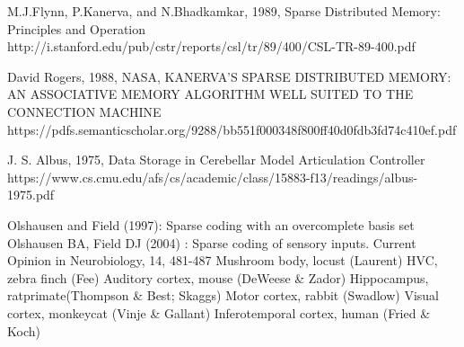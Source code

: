 \documentclass[10pt,a4paper]{article}
\begin{document}
\newpage



\begin{thebibliography}{4}

 M.J.Flynn, P.Kanerva, and N.Bhadkamkar, 1989, Sparse Distributed Memory: Principles and Operation
http://i.stanford.edu/pub/cstr/reports/csl/tr/89/400/CSL-TR-89-400.pdf

 David Rogers, 1988, NASA, KANERVA’S SPARSE DISTRIBUTED MEMORY: AN ASSOCIATIVE MEMORY ALGORITHM WELL SUITED TO THE CONNECTION MACHINE
https://pdfs.semanticscholar.org/9288/bb551f000348f800ff40d0fdb3fd74c410ef.pdf

 J. S. Albus, 1975, Data Storage in Cerebellar Model Articulation Controller
https://www.cs.cmu.edu/afs/cs/academic/class/15883-f13/readings/albus-1975.pdf



 Olshausen and Field (1997): Sparse coding with an overcomplete basis set
 Olshausen BA, Field DJ (2004) : Sparse coding of sensory inputs. Current Opinion in Neurobiology, 14, 481-487
 Mushroom body, locust  (Laurent)
 HVC, zebra finch (Fee)
 Auditory cortex, mouse  (DeWeese \& Zador)
 Hippocampus, rat\/primate(Thompson \& Best; Skaggs)
 Motor cortex, rabbit  (Swadlow)
 Visual cortex, monkey\/cat  (Vinje \& Gallant)
 Inferotemporal cortex, human (Fried \& Koch)



\end{thebibliography}
\end{document}
